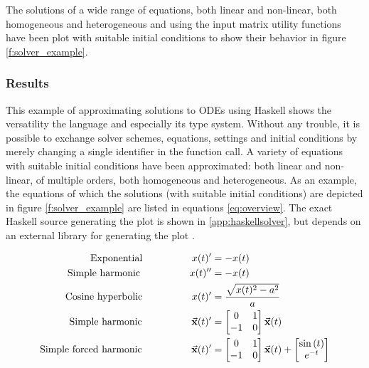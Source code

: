 The solutions of a wide range of equations, both linear and non-linear, both homogeneous and heterogeneous and using the input matrix utility functions have been plot with suitable initial conditions to show their behavior in figure \ref{f:solver_example}.



\subsubsection{Results}
This example of approximating solutions to ODEs using Haskell shows the versatility the language and especially its type system. Without any trouble, it is possible to exchange solver schemes, equations, settings and initial conditions by merely changing a single identifier in the function call. A variety of equations with suitable initial conditions have been approximated: both linear and non-linear, of multiple orders, both homogeneous and heterogeneous. As an example, the equations of which the solutions (with suitable initial conditions) are depicted in figure \ref{f:solver_example} are listed in equations \ref{eq:overview}. The exact Haskell source generating the plot is shown in \ref{app:haskellsolver}, but depends on an external library for generating the plot \cite{HaskellChart}.

\begin{align}
	\label{eq:overview}	
	\text{Exponential}\hspace{50pt}{}			x(t)' &= -x(t)  \nonumber \\
	\text{Simple harmonic}\hspace{50pt}{}		x(t)'' &= -x(t) \nonumber \\
	\text{Cosine hyperbolic}\hspace{50pt}{}		x(t)' &= \frac{\sqrt{x(t)^{2} - a^{2}}}{a} \\
	\text{Simple harmonic}\hspace{50pt}{}		\vec{\mathbf{x}}(t)' &= \begin{bmatrix} 0 & 1 \\ -1 & 0 \\ \end{bmatrix}\vec{\mathbf{x}}(t) \nonumber \\
	\text{Simple forced harmonic}\hspace{50pt}{}	\vec{\mathbf{x}}(t)' &= \begin{bmatrix} 0 & 1 \\ -1 & 0 \\ \end{bmatrix}\vec{\mathbf{x}}(t) + \begin{bmatrix} \sin{(t)} \\ e^{-t} \\ \end{bmatrix} \nonumber
\end{align}

